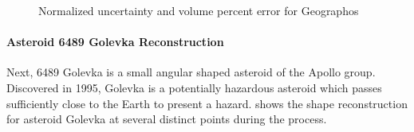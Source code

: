 \documentclass[journal]{new-aiaa}
\begin{document}
\begin{figure}[htbp]
    \centering
    
    \caption{Normalized uncertainty and volume percent error for Geographos\label{fig:geographos_metrics}}
\end{figure}

\paragraph{Asteroid \num{6489} Golevka Reconstruction} 
Next, \num{6489} Golevka is a small angular shaped asteroid of the Apollo group.
Discovered in \num{1995}, Golevka is a potentially hazardous asteroid which passes sufficiently close to the Earth to present a hazard.
 shows the shape reconstruction for asteroid Golevka at several distinct points during the process.
\end{document}
